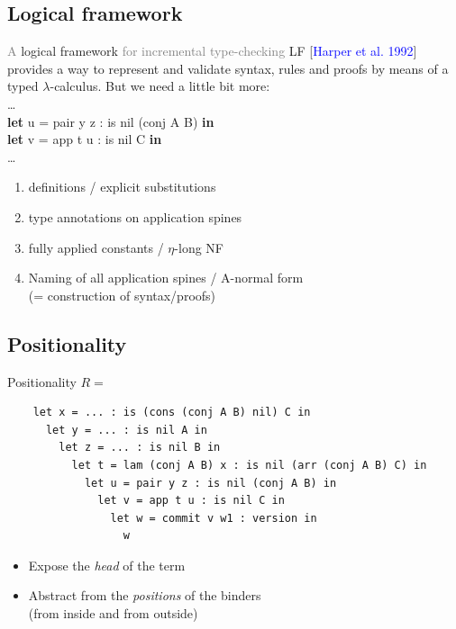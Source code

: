 \documentclass[ignorenonframetext,red]{beamer}
\newcommand\gray[1]{\textcolor{gray}{#1}}
\newcommand\cit[1]{[\textcolor{blue}{#1}]}
\begin{document}
\subsection{Logical framework}

\begin{frame}[fragile]{\gray{A} logical framework \gray{for incremental type-checking}}
  LF \cit{Harper et al. 1992} provides a way to represent and validate
  syntax, rules and proofs by means of a typed $\lambda$-calculus. But
  we need a little bit more: \\[1em]

  {\small\textsf{
      \noindent\ldots\\
      \alert<2>{\textbf{let}} \alert<5>u = \alert<4>{pair y z} : \alert<3>{is nil (conj A B)} \textbf{in}\\
      \hspace{2ex}\textbf{let} \alert<5>v = app t u : is nil C \textbf{in}\\
      \ldots
  }}
\pause
\begin{enumerate}[<+->]
\item definitions / explicit substitutions
\item type annotations on application spines
\item fully applied constants / $\eta$-long NF
\item Naming of all application spines / A-normal form\\
  {\footnotesize(= construction of syntax/proofs)}
\end{enumerate}

\end{frame}

\subsection{Positionality}

\begin{frame}[fragile]{Positionality}
$R =$ \scriptsize
\begin{lstlisting}
    let x = ... : is (cons (conj A B) nil) C in
      let y = ... : is nil A in
        let z = ... : is nil B in
          let t = lam (conj A B) x : is nil (arr (conj A B) C) in
            let u = pair y z : is nil (conj A B) in
              let v = app t u : is nil C in
                let w = commit v w1 : version in
                  w
\end{lstlisting}
\normalsize
\pause
\begin{itemize}
\item Expose the \emph{head} of the term
\item \pause Abstract from the \emph{positions} of the binders \\
  {\footnotesize (from inside and from outside)}
\end{itemize}
\end{frame}
\end{document}
